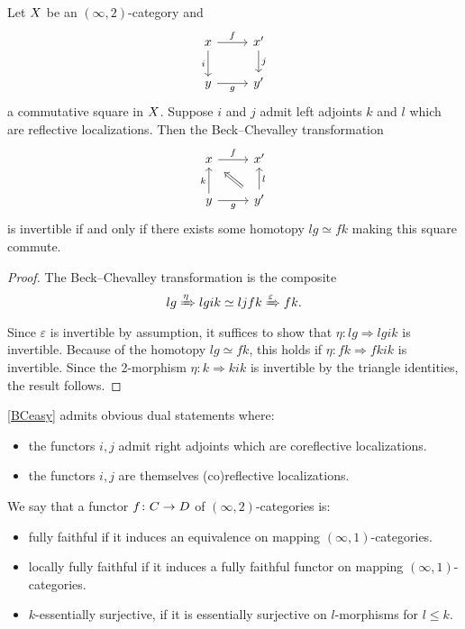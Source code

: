 \documentclass[a4paper,reqno,twoside]{amsart}
\begin{document}
\begin{lemma}\label{BCeasy}
	Let $\sX$ be an $(\infty,2)$-category and
	\[\begin{tikzcd}
		x & {x'} \\
		y & {y'}
		\arrow["f",from=1-1, to=1-2]
		\arrow["i"', from=1-1, to=2-1]
		\arrow["{j}", from=1-2, to=2-2]
		\arrow["g"',from=2-1, to=2-2]
	\end{tikzcd}\]
	a commutative square in $\sX$.
	Suppose $i$ and $j$ admit left adjoints $k$ and $l$ which are reflective localizations.
	Then the Beck--Chevalley transformation
	\[\begin{tikzcd}
		x & {x'} \\
		y & {y'}
		\arrow["f", from=1-1, to=1-2]
		\arrow[shorten <= 6, shorten >= 6, Rightarrow, from=2-2, to=1-1]
		\arrow["k", from=2-1, to=1-1]
		\arrow["g"', from=2-1, to=2-2]
		\arrow["l"', from=2-2, to=1-2]
	\end{tikzcd}\]
	is invertible if and only if there exists some homotopy $lg \simeq fk$ making this square commute. 
\end{lemma}

\begin{proof}
	The Beck--Chevalley transformation is the composite
	\[lg \xRightarrow{\eta} lgik \simeq ljfk \xRightarrow{\epsilon} fk.\]
	Since $\varepsilon$ is invertible by assumption, it suffices to show that $\eta \colon lg \Rightarrow lgik$ is invertible.
	Because of the homotopy $lg \simeq fk$, this holds if $\eta \colon fk \Rightarrow fkik$ is invertible.
	Since the 2-morphism $\eta \colon k \Rightarrow kik$ is invertible by the triangle identities, the result follows.
\end{proof}

\begin{remark}\label{rem:BCeasy}
	\cref{BCeasy} admits obvious dual statements where:
	\begin{itemize}
		\item the functors $i,j$ admit right adjoints which are coreflective localizations. 
		\item the functors $i,j$ are themselves (co)reflective localizations.
	\end{itemize} 
\end{remark}

\begin{definition}
	We say that a functor $f \colon \cC \to \cD$ of $(\infty,2)$-categories is:
	\begin{itemize}
		\item fully faithful if it induces an equivalence on mapping $(\infty,1)$-categories.
		\item locally fully faithful if it induces a fully faithful functor on mapping $(\infty,1)$-categories.
		\item $k$-essentially surjective, if it is essentially surjective on $l$-morphisms for $l \leq k$.
	\end{itemize}
\end{definition}
\end{document}
